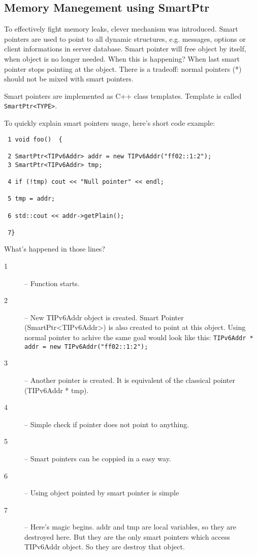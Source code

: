 \subsection{Memory Manegement using SmartPtr}
To effectively fight memory leaks, clever mechanism was
introduced. Smart pointers are used to point to all dynamic
structures, e.g. messages, options or client informations in server
database. Smart pointer will free object by itself, when object is no
longer needed. When this is happening? When last smart pointer stops
pointing at the object. There is a tradeoff: normal pointers (*)
should not be mixed with smart pointers. 

Smart pointers are implemented as C++ class templates. Template is
called \verb+SmartPtr<TYPE>+.

To quickly explain smart pointers usage, here's short code example:
\begin{verbatim}
 1 void foo()  {

 2 SmartPtr<TIPv6Addr> addr = new TIPv6Addr("ff02::1:2");
 3 SmartPtr<TIPv6Addr> tmp;

 4 if (!tmp) cout << "Null pointer" << endl;

 5 tmp = addr;
 
 6 std::cout << addr->getPlain();

 7}
\end{verbatim}
What's happened in those lines?
\begin{description}
\item[1] -- Function starts.
\item[2] -- New TIPv6Addr object is created. Smart Pointer
  (SmartPtr<TIPv6Addr>) is also created to point at this object. Using
  normal pointer to achive the same goal would look like this:
  \verb+TIPv6Addr * addr = new TIPv6Addr("ff02::1:2");+
\item[3] -- Another pointer is created. It is equivalent of the
  classical pointer (TIPv6Addr * tmp).
\item[4] -- Simple check if pointer does not point to anything.
\item[5] -- Smart pointers can be coppied in a easy way.
\item[6] -- Using object pointed by smart pointer is simple
\item[7] -- Here's magic begins. addr and tmp are local variables, so
  they are destroyed here. But they are the only smart pointers which
  access TIPv6Addr object. So they are destroy that object. 
\end{description}

